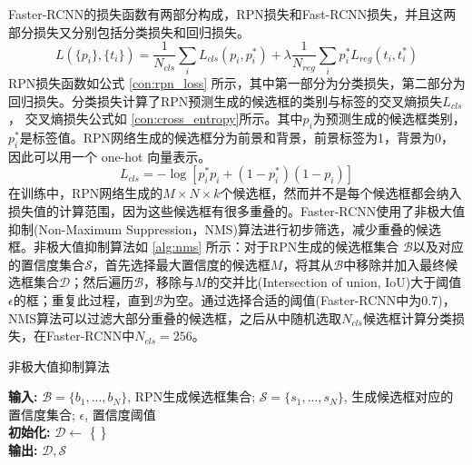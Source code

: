 Faster-RCNN的损失函数有两部分构成，RPN损失和Fast-RCNN损失，并且这两部分损失又分别包括分类损失和回归损失。
\begin{equation}
L(\{p_i\},\{t_i\}) =\frac{1}{N_{cls}} \sum_{i}L_{cls}(p_i, p^*_i) + \lambda \frac{1}{N_{reg}} \sum_{i} p^*_i L_{reg}(t_i,t^*_i)
\label{con:rpn_loss}
\end{equation}
RPN损失函数如公式 \ref{con:rpn_loss} 所示，其中第一部分为分类损失，第二部分为回归损失。分类损失计算了RPN预测生成的候选框的类别与标签的交叉熵损失$L_{cls}$， 交叉熵损失公式如 \ref{con:cross_entropy}所示。其中$p_i$为预测生成的候选框类别，$p^*_i$是标签值。RPN网络生成的候选框分为前景和背景，前景标签为1，背景为0，因此可以用一个 one-hot 向量表示。
\begin{equation}
L_{cls} = -\log[p^*_ip_i + (1-p^*_i)(1-p_i)]
\label{con:cross_entropy}
\end{equation}
在训练中，RPN网络生成的$M \times N \times k$个候选框，然而并不是每个候选框都会纳入损失值的计算范围，因为这些候选框有很多重叠的。Faster-RCNN使用了非极大值抑制(Non-Maximum Suppression，NMS)算法进行初步筛选，减少重叠的候选框。非极大值抑制算法如 \ref{alg:nms} 所示：对于RPN生成的候选框集合 $\mathcal{B}$以及对应的置信度集合$\mathcal{S}$，首先选择最大置信度的候选框$M$，将其从$\mathcal{B}$中移除并加入最终候选框集合$\mathcal{D}$；然后遍历$\mathcal{B}$，移除与$M$的交并比(Intersection of union, IoU)大于阈值$\epsilon$的框；重复此过程，直到$\mathcal{B}$为空。通过选择合适的阈值(Faster-RCNN中为0.7)，NMS算法可以过滤大部分重叠的候选框，之后从中随机选取$N_{cls}$候选框计算分类损失，在Faster-RCNN中$N_{cls} = 256$。
\begin{algorithm}[!h]
	\caption{非极大值抑制算法}
	\label{alg:nms}
	\textbf{输入: } $\mathcal{B}=\{b_1,...,b_N\}$, RPN生成候选框集合; $\mathcal{S}=\{s_1,...,s_N\}$, 生成候选框对应的置信度集合; $\epsilon$, 置信度阈值 \\
	\textbf{初始化:} $\mathcal{D} \leftarrow$ \{ \} \\
	\textbf{输出: } $\mathcal{D},\mathcal{S}$
\end{algorithm}

